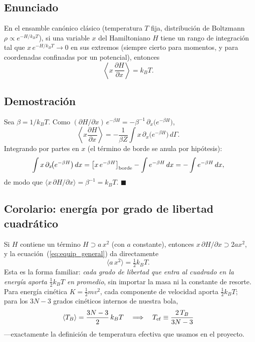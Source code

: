 \documentclass[11pt,a4paper]{article}
\newcommand{\kb}{k_B}
\begin{document}
\subsection{Enunciado}

En el ensamble canónico clásico (temperatura $T$ fija, distribución de
Boltzmann $\rho \propto e^{-H/\kb T}$), si una variable $x$ del
Hamiltoniano $H$ tiene un rango de integración tal que
$x\,e^{-H/\kb T}\to0$ en sus extremos (siempre cierto para momentos, y para
coordenadas confinadas por un potencial), entonces
\begin{equation}
\left\langle x\,\frac{\partial H}{\partial x}\right\rangle = \kb T.
\label{eq:equip_general}
\end{equation}

\subsection{Demostración}

Sea $\beta=1/\kb T$. Como
$(\partial H/\partial x)\,e^{-\beta H} = -\beta^{-1}\,\partial_x
\big(e^{-\beta H}\big)$,
\[ \left\langle x\frac{\partial H}{\partial x}\right\rangle
   = -\frac{1}{\beta Z}\int x\,\partial_x\!\big(e^{-\beta H}\big)\,d\Gamma. \]
Integrando por partes en $x$ (el término de borde se anula por hipótesis):
\[ \int x\,\partial_x\!\big(e^{-\beta H}\big)\,dx
   = \big[x\,e^{-\beta H}\big]_{\rm borde} - \int e^{-\beta H}\,dx
   = -\int e^{-\beta H}\,dx, \]
de modo que $\langle x\,\partial H/\partial x\rangle
= \beta^{-1} = \kb T$. $\blacksquare$

\subsection{Corolario: energía por grado de libertad cuadrático}

Si $H$ contiene un término $H\supset a\,x^2$ (con $a$ constante), entonces
$x\,\partial H/\partial x \supset 2a x^2$, y la ecuación~(\ref{eq:equip_general})
da directamente
\begin{equation}
\langle a\,x^2 \rangle = \tfrac12 \kb T.
\label{eq:equip_cuadratico}
\end{equation}
Esta es la forma familiar: \emph{cada grado de libertad que entra al
cuadrado en la energía aporta $\tfrac12\kb T$ en promedio}, sin importar la
masa ni la constante de resorte. Para energía cinética
$K=\tfrac12 m v^2$, cada componente de velocidad aporta $\tfrac12\kb T$;
para los $3N-3$ grados cinéticos internos de nuestra bola,
\begin{equation}
\langle T_B\rangle = \frac{3N-3}{2}\,\kb T
\quad\Longrightarrow\quad
T_{\rm ef} \equiv \frac{2\,T_B}{3N-3}
\label{eq:Tef_derivada}
\end{equation}
---exactamente la definición de temperatura efectiva que usamos en el
proyecto.
\end{document}
